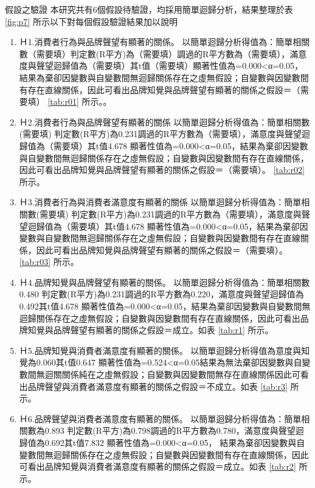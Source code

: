 假設之驗證
本研究共有6個假設待驗證，均採用簡單迴歸分析，結果整理於表 \ref{fig:p7} 所示以下對每個假設驗證結果加以說明
\begin{enumerate}
\item Ｈ1.消費者行為與品牌聲望有顯著的關係。
以簡單迴歸分析得值為：簡單相關數（需要填）判定數(R平方)為（需要填）調過的R平方數為（需要填），滿意度與聲望迴歸值為（需要填）其t值（需要填）顯著性值為=0.000<α=0.05，結果為棄卻因變數與自變數間無迴歸關係存在之虛無假設；自變數與因變數間有存在直線關係，因此可看出品牌知覺與品牌聲望有顯著的關係之假設＝（需要填） \ref{tab:r01}  所示。。
\item Ｈ2.消費者行為與品牌聲望有顯著的關係
以簡單迴歸分析得值為：簡單相關數(需要填) 判定數(R平方)為0.231調過的R平方數為（需要填），滿意度與聲望迴歸值為（需要填）其t值4.678 顯著性值為=0.000<α=0.05，結果為棄卻因變數與自變數間無迴歸關係存在之虛無假設；自變數與因變數間有存在直線關係，因此可看出品牌知覺與品牌聲望有顯著的關係之假設＝（需要填）。 \ref{tab:r02}  所示。
\item Ｈ3.消費者行為與消費者滿意度有顯著的關係
以簡單迴歸分析得值為：簡單相關數(需要填) 判定數(R平方)為0.231調過的R平方數為（需要填），滿意度與聲望迴歸值為（需要填）其t值4.678 顯著性值為=0.000<α=0.05，結果為棄卻因變數與自變數間無迴歸關係存在之虛無假設；自變數與因變數間有存在直線關係，因此可看出品牌知覺與品牌聲望有顯著的關係之假設＝（需要填）。 \ref{tab:r03}  所示。
\item Ｈ4.品牌知覺與品牌聲望有顯著的關係。
以簡單迴歸分析得值為：簡單相關數0.480 判定數(R平方)為0.231調過的R平方數為0.220，滿意度與聲望迴歸值為0.492其t值4.678 顯著性值為=0.000<α=0.05，結果為棄卻因變數與自變數間無迴歸關係存在之虛無假設；自變數與因變數間有存在直線關係，因此可看出品牌知覺與品牌聲望有顯著的關係之假設＝成立。如表 \ref{tab:r1}  所示。
\item Ｈ5.品牌知覺與消費者滿意度有顯著的關係。
以簡單迴歸分析得值為意度與知覺為0.060其t值0.647 顯著性值為=0.524<α=0.05結果為無法棄卻因變數與自變數間無迴關關係純在之虛無假設；自變數與因變數間無存在直線關係因此可看出品牌聲望與消費者滿意度有顯著的關係之假設＝不成立。如表 \ref{tab:r3}  所示。
\item Ｈ6.品牌聲望與消費者滿意度有顯著的關係。
以簡單迴歸分析得值為：簡單相關數為0.893 判定數(R平方)為0.798調過的R平方數為0.780，滿意度與聲望迴歸值為0.692其t值7.832 顯著性值為=0.000<α=0.05， 結果為棄卻因變數與自變數間無迴歸關係存在之虛無假設；自變數與因變數間有存在直線關係，因此可看出品牌知覺與消費者滿意度有顯著的關係之假設＝成立。如表 \ref{tab:r2}  所示。

\end{enumerate}



